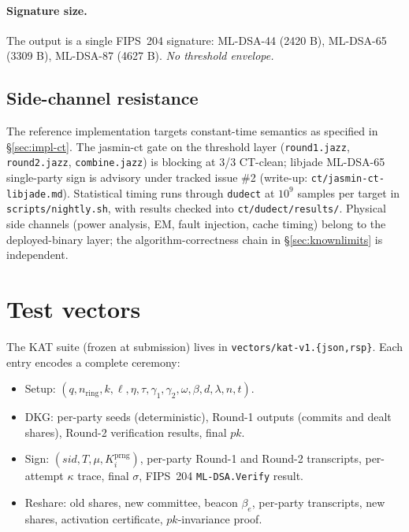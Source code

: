 \documentclass[11pt,a4paper]{article}
\theoremstyle{definition}
\theoremstyle{remark}
\begin{document}
\paragraph{Signature size.} The output is a single FIPS~204
signature: ML-DSA-44 (2420 B), ML-DSA-65 (3309 B), ML-DSA-87
(4627 B). \emph{No threshold envelope.}

\subsection{Side-channel resistance}
\label{sec:impl-sidechannel}

The reference implementation targets constant-time semantics as
specified in \S\ref{sec:impl-ct}. The jasmin-ct gate on the
threshold layer (\texttt{round1.jazz}, \texttt{round2.jazz},
\texttt{combine.jazz}) is blocking at 3/3 CT-clean; libjade
ML-DSA-65 single-party sign is advisory under tracked issue \#2
(write-up: \texttt{ct/jasmin-ct-libjade.md}). Statistical timing
runs through \texttt{dudect} at $10^9$ samples per target in
\texttt{scripts/nightly.sh}, with results checked into
\texttt{ct/dudect/results/}. Physical side channels (power
analysis, EM, fault injection, cache timing) belong to the
deployed-binary layer; the algorithm-correctness chain in
\S\ref{sec:knownlimits} is independent.

\section{Test vectors}
\label{sec:vectors}

The KAT suite (frozen at submission) lives in
\texttt{vectors/kat-v1.\{json,rsp\}}. Each entry encodes a complete
ceremony:

\begin{itemize}[leftmargin=*, itemsep=0pt]
\item Setup: $(q, n_{\mathrm{ring}}, k, \ell, \eta, \tau, \gamma_1, \gamma_2, \omega, \beta, d, \lambda, n, t)$.
\item DKG: per-party seeds (deterministic), Round-1 outputs (commits and dealt shares), Round-2 verification results, final $\mathit{pk}$.
\item Sign: $(\mathit{sid}, T, \mu, K_i^{\mathrm{prng}})$, per-party Round-1 and Round-2 transcripts, per-attempt $\kappa$ trace, final $\sigma$, FIPS~204 \texttt{ML-DSA.Verify} result.
\item Reshare: old shares, new committee, beacon $\beta_e$, per-party transcripts, new shares, activation certificate, $\mathit{pk}$-invariance proof.
\end{itemize}
\end{document}
